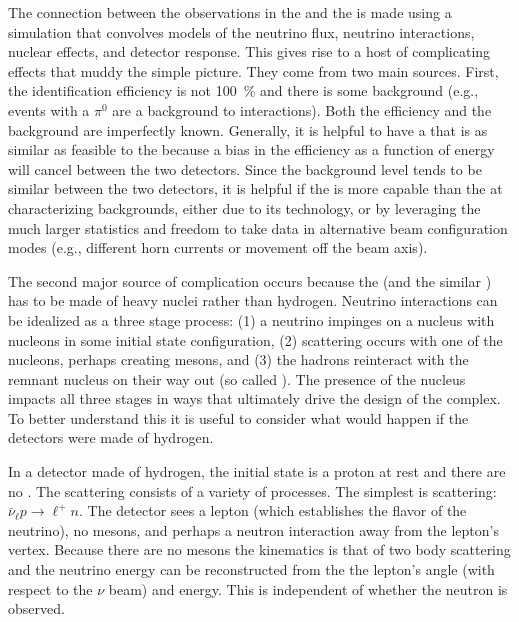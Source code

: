 The connection between the observations in the  and the  is made using a simulation that convolves models of the neutrino flux, neutrino interactions, nuclear effects, and detector response.
This gives rise to a host of complicating effects that 
muddy the simple picture. They come from two main sources. First, the identification efficiency is not \SI{100}{\%} and there is 
some background (e.g.,  events with a $\pi^0$ are a background to \nue {} interactions). Both the efficiency and the background are imperfectly known. Generally, it is helpful to have a   that is as similar as feasible to the   because a bias in the efficiency as a function of energy will cancel between the two detectors. Since the background level tends to be similar between the two detectors, it is helpful if the  is more capable than the  at characterizing backgrounds, either due to its technology, or by leveraging the much larger statistics and freedom to take data in alternative beam configuration modes (e.g., different horn currents or movement off the beam axis). 

The second major source of complication occurs because the  (and the similar ) has to be made of heavy nuclei rather than hydrogen. Neutrino interactions can be idealized as a three stage process: (1) a neutrino impinges on a nucleus with nucleons in some initial state configuration, (2) scattering occurs with one of the nucleons, perhaps creating mesons, and (3) the hadrons reinteract with the remnant nucleus on their way out (so called ). The presence of the nucleus impacts all three stages in ways that ultimately drive the design of the   complex. To better understand this it is useful to consider what would happen if the detectors were made of hydrogen.


In a detector made of hydrogen, the initial state is a proton at rest and there are no . The scattering consists of a variety of processes. The simplest is  scattering: $\bar{\nu}_\ell p \to \ell^+ n$. The detector sees a lepton (which establishes the flavor of the neutrino), no mesons, and perhaps a neutron interaction away from the lepton's vertex. Because there are no mesons the kinematics is that of two body scattering and the neutrino energy can be reconstructed from the the lepton's angle (with respect to the $\nu$ beam) and energy. This is independent of whether the neutron is observed.

